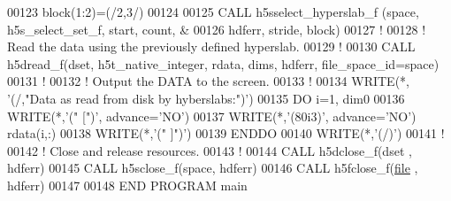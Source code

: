 \begin{DoxyCode}
00123   block(1:2)=(/2,3/)
00124 
00125   \textcolor{keyword}{CALL }h5sselect\_hyperslab\_f (space, h5s\_select\_set\_f, start, count, &
00126        hdferr, stride, block)
00127   \textcolor{comment}{!}
00128   \textcolor{comment}{! Read the data using the previously defined hyperslab.}
00129   \textcolor{comment}{!}
00130   \textcolor{keyword}{CALL }h5dread\_f(dset, h5t\_native\_integer, rdata, dims, hdferr, file\_space\_id=space)
00131   \textcolor{comment}{!}
00132   \textcolor{comment}{! Output the DATA to the screen.}
00133   \textcolor{comment}{!}
00134   \textcolor{keyword}{WRITE}(*, \textcolor{stringliteral}{'(/,"Data as read from disk by hyberslabs:")'})
00135   \textcolor{keywordflow}{DO} i=1, dim0
00136      \textcolor{keyword}{WRITE}(*,\textcolor{stringliteral}{'(" [")'}, advance=\textcolor{stringliteral}{'NO'})
00137      \textcolor{keyword}{WRITE}(*,\textcolor{stringliteral}{'(80i3)'}, advance=\textcolor{stringliteral}{'NO'}) rdata(i,:)
00138      \textcolor{keyword}{WRITE}(*,\textcolor{stringliteral}{'(" ]")'})
00139 \textcolor{keywordflow}{  ENDDO}
00140   \textcolor{keyword}{WRITE}(*,\textcolor{stringliteral}{'(/)'})
00141   \textcolor{comment}{!}
00142   \textcolor{comment}{! Close and release resources.}
00143   \textcolor{comment}{!}
00144   \textcolor{keyword}{CALL }h5dclose\_f(dset , hdferr)
00145   \textcolor{keyword}{CALL }h5sclose\_f(space, hdferr)
00146   \textcolor{keyword}{CALL }h5fclose\_f(\hyperlink{structfile}{file} , hdferr)
00147   
00148 \textcolor{keyword}{END PROGRAM }main
\end{DoxyCode}
